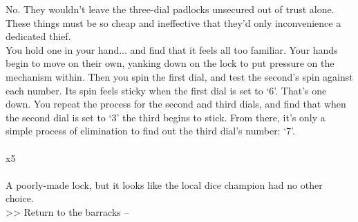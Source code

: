 No. They wouldn’t leave the three-dial padlocks unsecured out of trust alone. These things must be so cheap and ineffective that they’d only inconvenience a dedicated thief.\\

You hold one in your hand... and find that it feels all too familiar. Your hands begin to move on their own, yanking down on the lock to put pressure on the mechanism within. Then you spin the first dial, and test the second’s spin against each number. Its spin feels sticky when the first dial is set to ‘6’. That’s one down. You repeat the process for the second and third dials, and find that when the second dial is set to ‘3’ the third begins to stick. From there, it’s only a simple process of elimination to find out the third dial’s number: ‘7’.\\
\\
 x5\\
\\

A poorly-made lock, but it looks like the local dice champion had no other choice.\\

>> Return to the barracks -- 